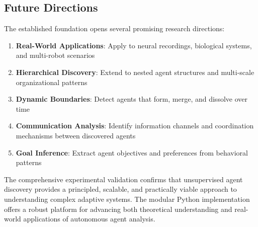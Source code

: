 \documentclass[10pt,conference]{IEEEtran}
\begin{document}
\subsection{Future Directions}
The established foundation opens several promising research directions:
\begin{enumerate}
  \item \textbf{Real-World Applications}: Apply to neural recordings, biological systems, and multi-robot scenarios
  \item \textbf{Hierarchical Discovery}: Extend to nested agent structures and multi-scale organizational patterns
  \item \textbf{Dynamic Boundaries}: Detect agents that form, merge, and dissolve over time
  \item \textbf{Communication Analysis}: Identify information channels and coordination mechanisms between discovered agents
  \item \textbf{Goal Inference}: Extract agent objectives and preferences from behavioral patterns
\end{enumerate}

The comprehensive experimental validation confirms that unsupervised agent discovery provides a principled, scalable, and practically viable approach to understanding complex adaptive systems. The modular Python implementation offers a robust platform for advancing both theoretical understanding and real-world applications of autonomous agent analysis.



\end{document}
